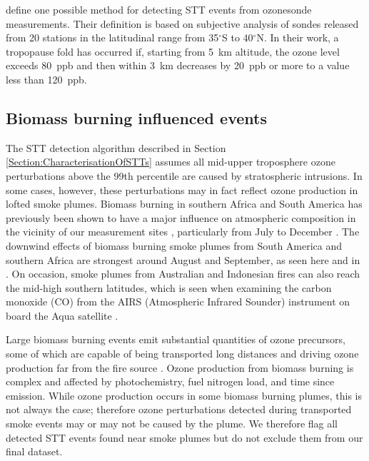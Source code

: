 \documentclass{article}
\begin{document}
    \citet{Tang2010} define one possible method for detecting STT events from ozonesonde measurements. 
    Their definition is based on subjective analysis of sondes released from 20 stations in the latitudinal range from 35$^\circ$S to 40$^\circ$N.
    In their work, a tropopause fold has occurred if, starting from 5~km altitude, the ozone level exceeds 80~ppb and then within 3~km decreases by 20~ppb or more to a value less than 120~ppb.

  \subsection{Biomass burning influenced events}
  \label{Section:BiomassBurning}
    The STT detection algorithm described in Section \ref{Section:CharacterisationOfSTTs} assumes all mid-upper troposphere ozone perturbations above the 99th percentile are caused by stratospheric intrusions. 
    In some cases, however, these perturbations may in fact reflect ozone production in lofted smoke plumes.
    Biomass burning in southern Africa and South America has previously been shown to have a major influence on atmospheric composition in the vicinity of our measurement sites \citep{Oltmans2001, Gloudemans2006, Edwards2006}, particularly from July to December \citep{Pak2003}.
    The downwind effects of biomass burning smoke plumes from South America and southern Africa are strongest around August and September, as seen here and in \citet{Liu2016}.
    On occasion, smoke plumes from Australian and Indonesian fires can also reach the mid-high southern latitudes, which is seen when examining the carbon monoxide (CO) from the AIRS (Atmospheric Infrared Sounder) instrument on board the Aqua satellite \citep{AIRS3STD}.
    
    Large biomass burning events emit substantial quantities of ozone precursors, some of which are capable of being transported long distances and driving ozone production far from the fire source \citep{Jaffe_2012}.
    Ozone production from biomass burning is complex and affected by photochemistry, fuel nitrogen load, and time since emission. 
    While ozone production occurs in some biomass burning plumes, this is not always the case; therefore ozone perturbations detected during transported smoke events may or may not be caused by the plume.
    We therefore flag all detected STT events found near smoke plumes but do not exclude them from our final dataset.
    
\end{document}

